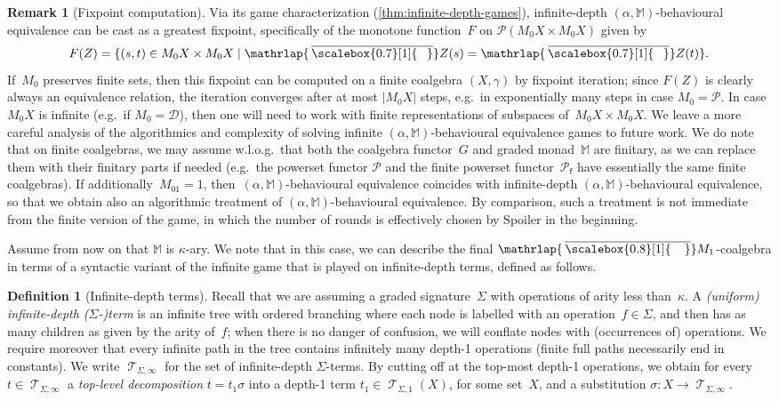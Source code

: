\documentclass[sigconf,
			final%
			nonacm
                        ]{acmart}
\numberwithin{equation}{section}
\numberwithin{equation}{section}
\theoremstyle{plain}
\theoremstyle{definition}
\newtheorem{defn}[thm]{Definition}
\newtheorem{rem}[thm]{Remark}
\newcommand{\mybar}[3]{%
  \mathrlap{\hspace{#2}\overline{\scalebox{#1}[1]{\hphantom{\ensuremath{#3}}\vphantom{\rule{0pt}{5.5pt}}}}}\ensuremath{#3}
}
\newcommand{\barM}{\mybar{0.8}{2pt}{M}_1}
\newcommand{\barZ}{\mybar{0.7}{1.75pt}{Z}}
\newcommand{\M}{\mathbb{M}}                   %
\DeclareMathOperator{\Terms}{\mathscr{T}}
\newcommand{\Termsarg}[1]{\Terms_{\!#1}}
\newcommand{\pow}{\mathscr P}              %
\newcommand{\powf}{\pow_{\mathsf f}}
\newcommand{\CalD}{\mathcal{D}}            %
\begin{document}
\begin{rem}[Fixpoint computation]
  Via its game characterization (\cref{thm:infinite-depth-games}),
  infinite-depth $(\alpha,\M)$-behavioural equivalence can be cast as
  a greatest fixpoint, specifically of the monotone function~$F$ on
  $\pow(M_0X\times M_0X)$ given by
  \begin{equation*}
    F(Z)=\{(s,t)\in M_0X\times M_0X\mid \barZ(s)=\barZ(t)\}.
  \end{equation*}
  If~$M_0$ preserves finite sets, then this fixpoint can be computed
  on a finite coalgebra $(X,\gamma)$ by fixpoint iteration; since
  $F(Z)$ is clearly always an equivalence relation, the iteration
  converges after at most $|M_0X|$ steps, e.g.~in exponentially many
  steps in case $M_0=\pow$. In case $M_0X$ is infinite (e.g.~if
  $M_0=\CalD$), then one will need to work with finite representations
  of subspaces of~$M_0X\times M_0X$. We leave a more careful analysis
  of the algorithmics and complexity of solving infinite
  $(\alpha,\M)$-behavioural equivalence games to future work. We do
  note that on finite coalgebras, we may assume w.l.o.g.~that both the
  coalgebra functor~$G$ and graded monad~$\M$ are finitary, as we can
  replace them with their finitary parts if needed (e.g.~the powerset
  functor $\pow$ and the finite powerset functor~$\powf$ have
  essentially the same finite coalgebras). If additionally~$M_01=1$,
  then~$(\alpha,\M)$-behavioural equivalence coincides with
  infinite-depth $(\alpha,\M)$-behavioural equivalence, so that we
  obtain also an algorithmic treatment of $(\alpha,\M)$-behavioural
  equivalence. By comparison, such a treatment is not immediate from
  the finite version of the game, in which the number of rounds is
  effectively chosen by Spoiler in the beginning.
\end{rem}
\noindent Assume from now on that $\M$ is $\kappa$-ary.
We note that in this case, we can describe the final $\barM$-coalgebra
in terms of a syntactic variant of the infinite game that is played on
infinite-depth terms, defined as follows.
%
\begin{defn}[Infinite-depth terms]
  Recall that we are assuming a graded signature~$\Sigma$ with
  operations of arity less than~$\kappa$. A \emph{(uniform)
    infinite-depth \mbox{($\Sigma$-)}term} is an infinite tree with
  ordered branching where each node is labelled with an
  operation~$f\in\Sigma$, and then has as many children as given
  by the arity of~$f$; when there is no danger of confusion, we
  will conflate nodes with (occurrences of) operations. We require
  moreover that every infinite path in the tree contains infinitely
  many depth-1 operations (finite full paths necessarily end in
  constants). We write $\Termsarg{\Sigma,\infty}$ for the set of
  infinite-depth $\Sigma$-terms. By cutting off at the top-most
  depth-1 operations, we obtain for every $t\in\Termsarg{\Sigma,\infty}$
  a \emph{top-level decomposition} $t=t_1\sigma$ into a depth-1 term
  $t_1\in\Termsarg{\Sigma,1}(X)$, for some set~$X$, and a substitution
  $\sigma\colon X\to\Termsarg{\Sigma,\infty}$.
\end{defn}
\end{document}
